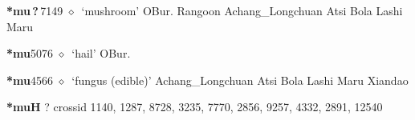   \begin{list}{}{\leftmargin=1.5em \itemindent=-1.5em}
  \item {\footnotesize \textbf{*mu\,?\,}}{\tiny 7149}
         $\diamond$~`mushroom'
         OBur. 
\hspace{1ex}
         Rangoon 
\hspace{1ex}
         Achang\_Longchuan 
\hspace{1ex}
         Atsi 
\hspace{1ex}
         Bola 
\hspace{1ex}
         Lashi 
\hspace{1ex}
         Maru 
  \item {\footnotesize \textbf{*mu}}{\tiny 5076}
\hspace{1ex}
         $\diamond$~`hail'
         OBur. 
  \item {\footnotesize \textbf{*mu}}{\tiny 4566}
\hspace{1ex}
         $\diamond$~`fungus (edible)'
         Achang\_Longchuan 
\hspace{1ex}
         Atsi 
\hspace{1ex}
         Bola 
\hspace{1ex}
         Lashi 
\hspace{1ex}
         Maru 
\hspace{1ex}
         Xiandao 
  \end{list}
\item
\textbf{*muH}
?
  {\tiny crossid 1140, 1287, 8728, 3235, 7770, 2856, 9257, 4332, 2891, 12540}
